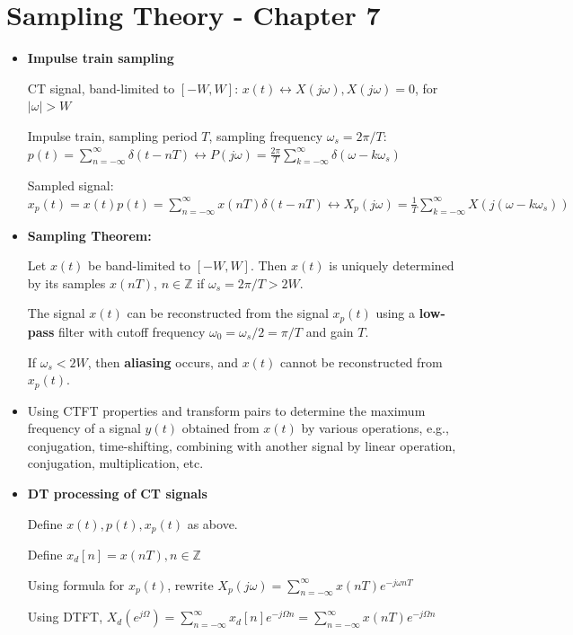 \documentclass[10pt, twocolumn]{article}
\begin{document}
\section{Sampling Theory - Chapter 7}
\begin{itemize}
    \item \textbf{Impulse train sampling}
    
    CT signal, band-limited to $[-W,W]$:
    $x(t) \leftrightarrow X(j\omega), X(j\omega) = 0$, for $|\omega| > W$
    
    Impulse train, sampling period $T$, sampling frequency $\omega_s = 2\pi/T$:
    $p(t) = \sum_{n=-\infty}^\infty \delta(t - nT) \leftrightarrow P(j\omega) = \frac{2\pi}{T} \sum_{k=-\infty}^\infty \delta(\omega - k\omega_s)$
    
    Sampled signal:
    $x_p(t) = x(t)p(t) = \sum_{n=-\infty}^\infty x(nT)\delta(t-nT) \leftrightarrow X_p(j\omega) = \frac{1}{T} \sum_{k=-\infty}^\infty X(j(\omega - k\omega_s))$

    \item \textbf{Sampling Theorem:}
    
    Let $x(t)$ be band-limited to $[-W,W]$. Then $x(t)$ is uniquely determined by its samples $x(nT)$, $n \in \mathbb{Z}$ if $\omega_s = 2\pi/T > 2W$.
    
    The signal $x(t)$ can be reconstructed from the signal $x_p(t)$ using a \textbf{low-pass} filter with cutoff frequency $\omega_0 = \omega_s/2 = \pi/T$ and gain $T$.
    
    If $\omega_s < 2W$, then \textbf{aliasing} occurs, and $x(t)$ cannot be reconstructed from $x_p(t)$.

    \item Using CTFT properties and transform pairs to determine the maximum frequency of a signal $y(t)$ obtained from $x(t)$ by various operations, e.g., conjugation, time-shifting, combining with another signal by linear operation, conjugation, multiplication, etc.

    \item \textbf{DT processing of CT signals}
    
    Define $x(t), p(t), x_p(t)$ as above.
    
    Define $x_d[n] = x(nT), n \in \mathbb{Z}$
    
    Using formula for $x_p(t)$, rewrite $X_p(j\omega) = \sum_{n=-\infty}^\infty x(nT)e^{-j\omega nT}$
    
    Using DTFT, $X_d(e^{j\Omega}) = \sum_{n=-\infty}^\infty x_d[n]e^{-j\Omega n} = \sum_{n=-\infty}^\infty x(nT)e^{-j\Omega n}$
    

\end{itemize}
\end{document}
